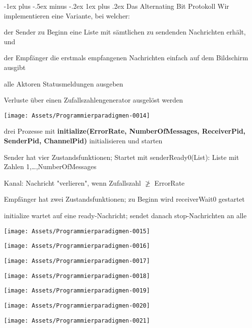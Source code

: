 \documentclass[10pt]{article}
\makeatletter
\renewcommand{\subsubsection}{\@startsection{subsubsection}{3}{0mm}%
                                {-1ex plus -.5ex minus -.2ex}%
                                {1ex plus .2ex}%
                                {\normalfont\small\bfseries}}
\makeatother
\begin{document}
\subsubsection{Das Alternating Bit Protokoll}
Wir implementieren eine Variante, bei welcher: 
\begin{itemize*}
  \item der Sender zu Beginn eine Liste mit sämtlichen zu sendenden Nachrichten erhält, und
  \item der Empfänger die erstmals empfangenen Nachrichten einfach auf dem Bildschirm ausgibt
  \item alle Aktoren Statusmeldungen ausgeben
  \item Verluste über einen Zufallszahlengenerator ausgelöst werden
\end{itemize*}
\begin{center}
  \centering
  \texttt{[image: Assets/Programmierparadigmen-0014]}
\end{center}
drei Prozesse mit \textbf{initialize(ErrorRate, NumberOfMessages, ReceiverPid, SenderPid, ChannelPid)} initialisieren und starten
\begin{itemize*}
  \item Sender hat vier Zustandsfunktionen; Startet mit senderReady0(List): Liste mit Zahlen 1,…,NumberOfMessages
  \item Kanal: Nachricht "verlieren", wenn Zufallszahl $\ngeq$ ErrorRate
  \item Empfänger hat zwei Zustandsfunktionen; zu Beginn wird receiverWait0 gestartet
  \item initialize wartet auf eine ready-Nachricht; sendet danach stop-Nachrichten an alle
\end{itemize*}
\begin{center}
  \centering
  \texttt{[image: Assets/Programmierparadigmen-0015]}
\end{center}
\begin{center}
  \centering
  \texttt{[image: Assets/Programmierparadigmen-0016]}
\end{center}
\begin{center}
  \centering
  \texttt{[image: Assets/Programmierparadigmen-0017]}
\end{center}
\begin{center}
  \centering
  \texttt{[image: Assets/Programmierparadigmen-0018]}
\end{center}
\begin{center}
  \centering
  \texttt{[image: Assets/Programmierparadigmen-0019]}
\end{center}
\begin{center}
  \centering
  \texttt{[image: Assets/Programmierparadigmen-0020]}
\end{center}
\begin{center}
  \centering
  \texttt{[image: Assets/Programmierparadigmen-0021]}
\end{center}
\end{document}
